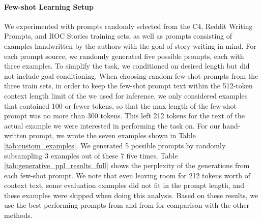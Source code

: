 \paragraph{Few-shot Learning Setup}
We experimented with prompts randomly selected from the C4, Reddit Writing Prompts, and ROC Stories training sets, as well as prompts consisting of examples handwritten by the authors with the goal of story-writing in mind.
For each prompt source, we randomly generated five possible prompts, each with three examples.
To simplify the task, we conditioned on desired length but did not include goal conditioning.
When choosing random few-shot prompts from the three train sets, in order to keep the few-shot prompt text within the 512-token context length limit of the \LLM \citep{thoppilan2022lamda} we used for inference, we only considered examples that contained 100 or fewer tokens, so that the max length of the few-shot prompt was no more than 300 tokens.
This left 212 tokens for the text of the actual example we were interested in performing the \FitB{} task on.
For our hand-written prompt, we wrote the seven examples shown in Table \ref{tab:custom_examples}.
We generated 5 possible prompts by randomly subsampling 3 examples out of these 7 five times.
Table \ref{tab:generative_ppl_results_full} shows the perplexity of the generations from each few-shot prompt.
We note that even leaving room for 212 tokens worth of context text, some evaluation examples did not fit in the prompt length, and these examples were skipped when doing this analysis.
Based on these results, we use the best-performing prompts from \rocFITB{} and from \cFITB{} for comparison with the other methods.


